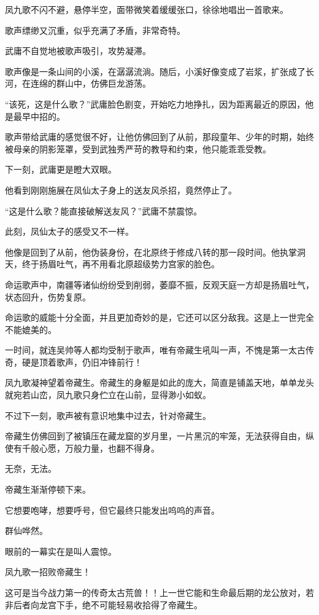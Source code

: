 \begin{this_body}
凤九歌不闪不避，悬停半空，面带微笑着缓缓张口，徐徐地唱出一首歌来。

歌声缥缈又沉重，似乎充满了矛盾，非常奇特。

武庸不自觉地被歌声吸引，攻势凝滞。

歌声像是一条山间的小溪，在潺潺流淌。随后，小溪好像变成了岩浆，扩张成了长河，在连绵的群山中，仿佛巨龙游荡。

“该死，这是什么歌？”武庸脸色剧变，开始吃力地挣扎，因为距离最近的原因，他是最早中招的。

歌声带给武庸的感觉很不好，让他仿佛回到了从前，那段童年、少年的时期，始终被母亲的阴影笼罩，受到武独秀严苛的教导和约束，他只能乖乖受教。

下一刻，武庸更是瞪大双眼。

他看到刚刚施展在凤仙太子身上的送友风杀招，竟然停止了。

“这是什么歌？能直接破解送友风？”武庸不禁震惊。

此刻，凤仙太子的感受又不一样。

他像是回到了从前，他伪装身份，在北原终于修成八转的那一段时间。他执掌洞天，终于扬眉吐气，再不用看北原超级势力宫家的脸色。

命运歌声中，南疆等诸仙纷纷受到削弱，萎靡不振，反观天庭一方却是扬眉吐气，状态回升，伤势复原。

命运歌的威能十分全面，并且更加奇妙的是，它还可以区分敌我。这是上一世完全不能媲美的。

一时间，就连吴帅等人都均受制于歌声，唯有帝藏生吼叫一声，不愧是第一太古传奇，硬是顶着歌声，仍旧冲锋前行！

凤九歌凝神望着帝藏生。帝藏生的身躯是如此的庞大，简直是铺盖天地，单单龙头就宛若山峦，凤九歌只身伫立在山前，显得渺小如蚁。

不过下一刻，歌声被有意识地集中过去，针对帝藏生。

帝藏生仿佛回到了被镇压在藏龙窟的岁月里，一片黑沉的牢笼，无法获得自由，纵使有千般心愿，万般力量，也翻不得身。

无奈，无法。

帝藏生渐渐停顿下来。

它想要咆哮，想要呼号，但它最终只能发出呜呜的声音。

群仙哗然。

眼前的一幕实在是叫人震惊。

凤九歌一招败帝藏生！

这可是当今战力第一的传奇太古荒兽！！上一世它能和生命最后期的龙公放对，若非后者向龙宫下手，绝不可能轻易收拾得了帝藏生。


\end{this_body}
